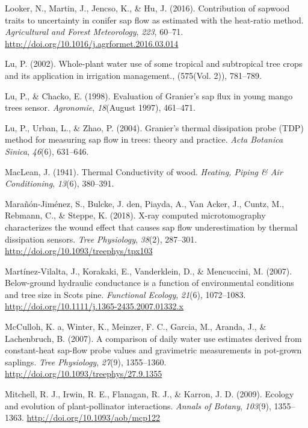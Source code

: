 \documentclass[11pt,twoside]{reedthesis}
\begin{document}
\hypertarget{ref-Looker2016}{}
Looker, N., Martin, J., Jencso, K., \& Hu, J. (2016). Contribution of
sapwood traits to uncertainty in conifer sap flow as estimated with the
heat-ratio method. \emph{Agricultural and Forest Meteorology},
\emph{223}, 60--71. \url{http://doi.org/10.1016/j.agrformet.2016.03.014}

\hypertarget{ref-Lu2002}{}
Lu, P. (2002). Whole-plant water use of some tropical and subtropical
tree crops and its application in irrigation management., (575(Vol. 2)),
781--789.

\hypertarget{ref-Lu1998}{}
Lu, P., \& Chacko, E. (1998). Evaluation of Granier's sap flux in young
mango trees sensor. \emph{Agronomie}, \emph{18}(August 1997), 461--471.

\hypertarget{ref-Lu2004}{}
Lu, P., Urban, L., \& Zhao, P. (2004). Granier's thermal dissipation
probe (TDP) method for measuring sap flow in trees: theory and practice.
\emph{Acta Botanica Sinica}, \emph{46}(6), 631--646.

\hypertarget{ref-MacLean1941}{}
MacLean, J. (1941). Thermal Conductivity of wood. \emph{Heating, Piping
\& Air Conditioning}, \emph{13}(6), 380--391.

\hypertarget{ref-Maranon-jimenez2018}{}
Marañón-Jiménez, S., Bulcke, J. den, Piayda, A., Van Acker, J., Cuntz,
M., Rebmann, C., \& Steppe, K. (2018). X-ray computed microtomography
characterizes the wound effect that causes sap flow underestimation by
thermal dissipation sensors. \emph{Tree Physiology}, \emph{38}(2),
287--301. \url{http://doi.org/10.1093/treephys/tpx103}

\hypertarget{ref-Martinez-Vilalta2007}{}
Martínez-Vilalta, J., Korakaki, E., Vanderklein, D., \& Mencuccini, M.
(2007). Below-ground hydraulic conductance is a function of
environmental conditions and tree size in Scots pine. \emph{Functional
Ecology}, \emph{21}(6), 1072--1083.
\url{http://doi.org/10.1111/j.1365-2435.2007.01332.x}

\hypertarget{ref-McCulloh2007}{}
McCulloh, K. a, Winter, K., Meinzer, F. C., Garcia, M., Aranda, J., \&
Lachenbruch, B. (2007). A comparison of daily water use estimates
derived from constant-heat sap-flow probe values and gravimetric
measurements in pot-grown saplings. \emph{Tree Physiology},
\emph{27}(9), 1355--1360.
\url{http://doi.org/10.1093/treephys/27.9.1355}

\hypertarget{ref-Mitchell2009}{}
Mitchell, R. J., Irwin, R. E., Flanagan, R. J., \& Karron, J. D. (2009).
Ecology and evolution of plant-pollinator interactions. \emph{Annals of
Botany}, \emph{103}(9), 1355--1363.
\url{http://doi.org/10.1093/aob/mcp122}
\end{document}
